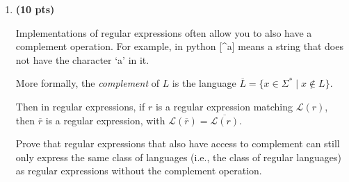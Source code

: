 \documentclass[11pt]{article}
\begin{document}
\begin{enumerate}[label=\textbf{Q\arabic*.}]
\begin{enumerate}[label=\textit{\alph*)}]
\begin{proof}
		First, suppose that \(\sigma = 0\), so \(\delta (q_2, 0) = q_1\). Notice that concatenating 0 to \(w\) is the same as performing a multiplication by 2 on \(w\), so it follows that \(w0 \equiv 1\ \mathrm{mod} \ 3\). Thus \(P_{q_1}(w0)\) is true.

		Second, suppose that \(\sigma = 1\), so \(\delta (q_2, 1) = q_2\). Concatenating 1 to \(w\) is the same as multiplication by 2 followed by addition by 1. It follows that \(w1 \equiv 2\ \mathrm{mod} \ 3\). Thus \(P_{q_2}(w1)\) is true.

		All cases have been considered, so it can be concluded that these state invariants are correct.

		Finally, it will be proven that this DFA accepts the language above, which will be denoted as \(L\).

		Let \(w \in L\). By definition, \(w\) is a multiple of 3, which means that \(w \equiv 0\ \mathrm{mod} \ 3\). From \(P_{q_0}(w)\), it follows that \(\delta (q_i, w) = q_0\), which is an accepting state. Therefore, the DFA accepts \(w\).

		Now, let \(w \notin L\). Then \(w\) is either \(\varepsilon\) or not a multiple of 3, meaning that \(w \not\equiv 0\ \mathrm{mod} \ 3\). In this case, then \(w \in q_i\) or \(w \in q_k\), where \(k\neq 0\) respectively, none of which are accepting states. Therefore, the DFA rejects \(w\).

		Therefore, since this DFA accepts exactly \(L\), it is correct and the proof is done.
	\end{proof}
\end{enumerate}




\item \textbf{(10 pts)}

Implementations of regular expressions often allow you to also have a complement operation. For example, in python [\^{}a] means a string that does not have the character `a' in it. 

More formally,  the \textit{complement} of $L$ is the language $\overline{L} = \{x \in \Sigma^* \mid x \notin L\}$. 

Then in regular expressions, if $r$ is a regular expression matching $\mathcal{L}(r)$, then $\overline{r}$ is a regular expression, with $\mathcal{L}(\overline{r}) = \overline{\mathcal{L}(r)}$. 



Prove that regular expressions that also have access to complement can still only express the same class of languages (i.e., the class of regular languages) as regular expressions without the complement operation. 


\end{enumerate}
\end{document}
